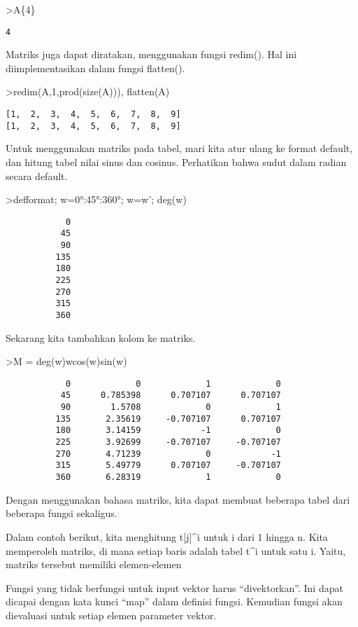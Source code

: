\documentclass[
]{book}
\begin{document}
\textgreater A\{4\}

\begin{verbatim}
4
\end{verbatim}

Matriks juga dapat diratakan, menggunakan fungsi redim(). Hal ini diimplementasikan dalam fungsi flatten().

\textgreater redim(A,1,prod(size(A))), flatten(A)

\begin{verbatim}
[1,  2,  3,  4,  5,  6,  7,  8,  9]
[1,  2,  3,  4,  5,  6,  7,  8,  9]
\end{verbatim}

Untuk menggunakan matriks pada tabel, mari kita atur ulang ke format default, dan hitung tabel nilai sinus dan cosinus. Perhatikan bahwa sudut dalam radian secara default.

\textgreater defformat; w=0°:45°:360°; w=w'; deg(w)

\begin{verbatim}
            0 
           45 
           90 
          135 
          180 
          225 
          270 
          315 
          360 
\end{verbatim}

Sekarang kita tambahkan kolom ke matriks.

\textgreater M = deg(w)\textbar w\textbar cos(w)\textbar sin(w)

\begin{verbatim}
            0             0             1             0 
           45      0.785398      0.707107      0.707107 
           90        1.5708             0             1 
          135       2.35619     -0.707107      0.707107 
          180       3.14159            -1             0 
          225       3.92699     -0.707107     -0.707107 
          270       4.71239             0            -1 
          315       5.49779      0.707107     -0.707107 
          360       6.28319             1             0 
\end{verbatim}

Dengan menggunakan bahasa matriks, kita dapat membuat beberapa tabel dari beberapa fungsi sekaligus.

Dalam contoh berikut, kita menghitung t{[}j{]}\^{}i untuk i dari 1 hingga n. Kita memperoleh matriks, di mana setiap baris adalah tabel t\^{}i untuk satu i. Yaitu, matriks tersebut memiliki elemen-elemen

Fungsi yang tidak berfungsi untuk input vektor harus ``divektorkan''. Ini dapat dicapai dengan kata kunci ``map'' dalam definisi fungsi. Kemudian fungsi akan dievaluasi untuk setiap elemen parameter vektor.
\end{document}
